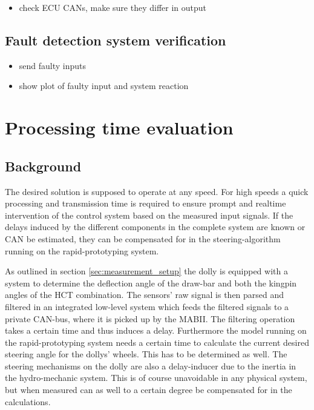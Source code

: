 \documentclass[ExampleMasters.tex]{subfiles}
\begin{document}
\begin{itemize}
	
	\item check \gls{ECU} \gls{CAN}s, make sure they differ in output
	
\end{itemize}

\subsection{Fault detection system verification}
\label{sec:fault_detect_test}

\begin{itemize}
	\item send faulty inputs
	\item show plot of faulty input and system reaction
	
\end{itemize}
\section{Processing time evaluation}
\label{chap:processing_time_delay}
\subsection{Background}
The desired solution is supposed to operate at any speed. For high speeds a quick processing and transmission time is required to ensure prompt and realtime intervention of the control system based on the measured input signals. If the delays induced by the different components in the complete system are known or \gls{CAN} be estimated, they can be compensated for in the steering-algorithm running on the rapid-prototyping system.

As outlined in section \ref{sec:measurement_setup} the dolly is equipped with a system to determine the deflection angle of the draw-bar and both the kingpin angles of the \gls{HCT} combination. The sensors' raw signal is then parsed and filtered in an integrated low-level system which feeds the filtered signals to a private \gls{CAN}-bus, where it is picked up by the \gls{MABII}. The filtering operation takes a certain time and thus induces a delay. Furthermore the model running on the rapid-prototyping system needs a certain time to calculate the current desired steering angle for the dollys' wheels. This has to be determined as well. The steering mechanisms on the dolly are also a delay-inducer due to the inertia in the hydro-mechanic system. This is of course unavoidable in any physical system, but when measured can as well to a certain degree be compensated for in the calculations. 
\end{document}
